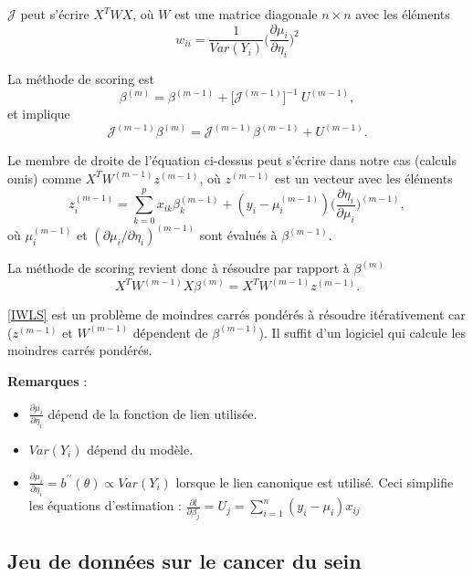 \documentclass{BeamerTemplate}
\begin{document}
\begin{refsection}
\begin{frame}{}
${\mathcal J}$ peut s'écrire $X^T W X$, où $W$ est une matrice diagonale $n \times
n$ avec les éléments
$$w_{ii} = \frac{1}{Var(Y_i)} \Big(\frac{\partial \mu_i}{\partial
  \eta_i}\Big)^2$$
\end{frame}

\begin{frame}{}
La méthode de scoring est
$$\beta^{(m)} = \beta^{(m-1)} + \big[{\mathcal J}^{(m-1)}\big]^{-1} \ U^{(m-1)},  $$
et implique
$${\mathcal J}^{(m-1)} \beta^{(m)} = {\mathcal J}^{(m-1)}
\beta^{(m-1)} + U^{(m-1)}.$$

Le membre de droite de l'équation ci-dessus peut s'écrire dans notre cas
(calculs omis) comme $X^T W^{(m-1)}
z^{(m-1)}$, où $z^{(m-1)}$ est un vecteur avec les éléments
$$z_i^{(m-1)} = \sum_{k=0}^p x_{ik} \beta_k^{(m-1)} +
  (y_i-\mu_i^{(m-1)})\Big(\frac{\partial \eta_i}{\partial \mu_i}\Big)^{(m-1)},$$
où $\mu_i^{(m-1)}$ et $(\partial \mu_i/\partial \eta_i)^{(m-1)}$ sont évalués à
  $\beta^{(m-1)}$.
\end{frame}

\begin{frame}{}
La méthode de scoring revient donc à résoudre par rapport à $ \beta^{(m)}$
\begin{equation}
  \label{IWLS}
  X^T W^{(m-1)} X \beta^{(m)} = X^T W^{(m-1)} z^{(m-1)}.
\end{equation}
\label{IWLSweights}

\eqref{IWLS} est un problème de moindres carrés pondérés à résoudre
itérativement car ($z^{(m-1)}$ et $W^{(m-1)}$ dépendent de 
$\beta^{(m-1)}$). Il suffit d'un logiciel qui calcule les moindres carrés pondérés.

\bigskip
\textbf{Remarques} :
\begin{itemize}
\item $\frac{\partial \mu_i}{\partial \eta_i}$ dépend de la fonction de lien
  utilisée.
\item $Var(Y_i)$ dépend du modèle.
\item $\frac{\partial \mu_i}{\partial \eta_i}= b^{\prime \prime}(\theta) \propto Var(Y_i)$ lorsque le lien canonique
est utilisé. Ceci simplifie les équations d'estimation :
$\frac{\partial l}{\partial \beta_j} = U_j = \sum_{i=1}^n
(y_i-\mu_i) x_{ij}$
\end{itemize}
\end{frame}

\subsection{Jeu de données sur le cancer du sein}


\end{refsection}
\end{document}
